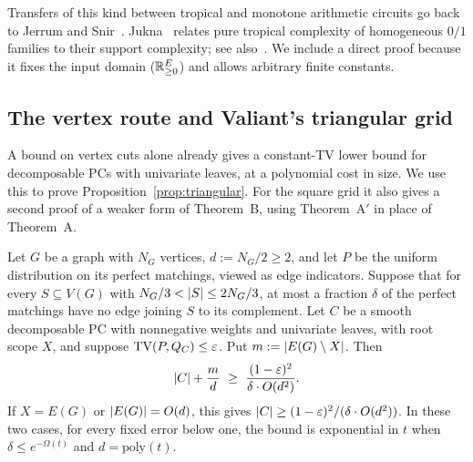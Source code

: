 Transfers of this kind between tropical and monotone arithmetic circuits go back to Jerrum and Snir~\cite{JerrumSnir82}. Jukna~\cite{Jukna16Tropical} relates pure tropical complexity of homogeneous $0/1$ families to their support complexity; see also~\cite{JuknaTropical23}. We include a direct proof because it fixes the input domain ($\mathbb{R}_{\ge0}^E$) and allows arbitrary finite constants.

\subsection{The vertex route and Valiant's triangular grid}\label{sec:vertex-route}

A bound on vertex cuts alone already gives a constant-TV lower bound for decomposable PCs with univariate leaves, at a polynomial cost in size. We use this to prove Proposition~\ref{prop:triangular}. For the square grid it also gives a second proof of a weaker form of Theorem~B, using Theorem~A$'$ in place of Theorem~A.

\begin{lemma}\label{lem:vertex-route}
Let $G$ be a graph with $N_G$ vertices, $d:=N_G/2\ge2$, and let $P$ be the uniform distribution on its perfect matchings, viewed as edge indicators. Suppose that for every $S\subseteq V(G)$ with $N_G/3<\lvert S\rvert\le2N_G/3$, at most a fraction $\delta$ of the perfect matchings have no edge joining $S$ to its complement. Let $C$ be a smooth decomposable PC with nonnegative weights and univariate leaves, with root scope $X$, and suppose $\mathrm{TV}(P,Q_C)\le\varepsilon$. Put $m:=\lvert E(G)\setminus X\rvert$. Then
\[
  \abs C+\frac{m}{d}\ \ge\ \frac{(1-\eps)^2}{\delta\cdot O(d^2)}.
\]
If $X=E(G)$ or $\lvert E(G)\rvert=O(d)$, this gives $\lvert C\rvert\ge(1-\varepsilon)^2/(\delta\cdot O(d^2))$. In these two cases, for every fixed error below one, the bound is exponential in $t$ when $\delta\le e^{-\Omega(t)}$ and $d=\mathrm{poly}(t)$.
\end{lemma}


